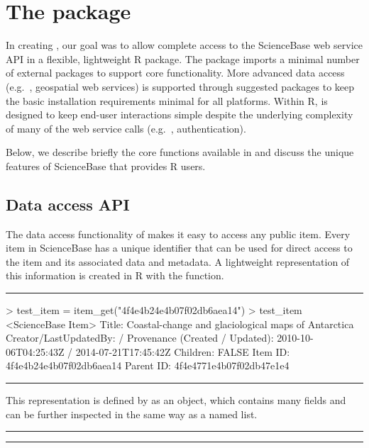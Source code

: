 
\section{The  package}

In creating , our goal was to allow complete
access to the ScienceBase web service API in a flexible, lightweight
R package. The package imports a minimal number of external packages
to support core functionality. More advanced data access (e.g.\ , geospatial
web services) is supported through suggested packages to keep the basic
installation requirements minimal for all platforms. Within R, 
is designed to keep end-user interactions simple despite the underlying 
complexity of many of the web service calls (e.g.\ , authentication).

Below, we describe briefly the core functions available in 
and discuss the unique features of ScienceBase that 
provides R users.


\subsection{Data access API}
The data access functionality of  makes it easy to
access any public item. Every item in ScienceBase has a unique identifier
that can be used for direct access to the item and its associated data and
metadata. A lightweight representation of this information is created in R
with the  function.

\noindent\rule{\textwidth}{0.4pt}
\begin{example}
> test_item = item_get("4f4e4b24e4b07f02db6aea14")
> test_item
<ScienceBase Item>
  Title: Coastal-change and glaciological maps of Antarctica
  Creator/LastUpdatedBy:      /
  Provenance (Created / Updated):  2010-10-06T04:25:43Z / 2014-07-21T17:45:42Z
  Children: FALSE
  Item ID: 4f4e4b24e4b07f02db6aea14
  Parent ID: 4f4e4771e4b07f02db47e1e4
\end{example}
\noindent\rule{\textwidth}{0.4pt}

This representation is defined by  as an  object,
which contains many fields and can be further inspected in the same
way as a named list.

\noindent\rule{\textwidth}{0.4pt}
\noindent\rule{\textwidth}{0.4pt}

